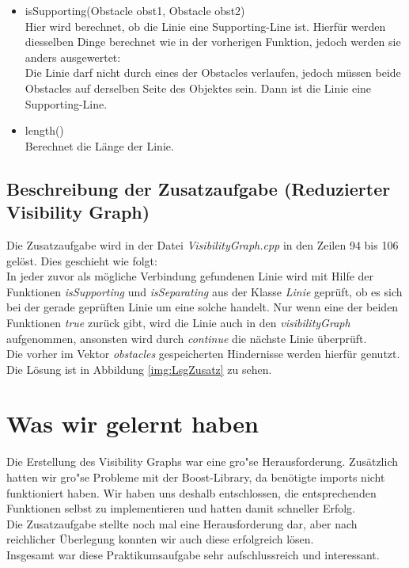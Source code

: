 \documentclass[a4paper]{scrartcl}
\begin{document}
\begin{itemize}
\item isSupporting(Obstacle obst1, Obstacle obst2)\\
Hier wird berechnet, ob die Linie eine Supporting-Line ist. Hierfür werden diesselben Dinge berechnet wie in der vorherigen Funktion, jedoch werden sie anders ausgewertet:\\
Die Linie darf nicht durch eines der Obstacles verlaufen, jedoch müssen beide Obstacles auf derselben Seite des Objektes sein. Dann ist die Linie eine Supporting-Line.\\
\item length()\\
Berechnet die Länge der Linie.
\end{itemize}


\subsection*{Beschreibung der Zusatzaufgabe (Reduzierter Visibility Graph)}
Die Zusatzaufgabe wird in der Datei \textit{VisibilityGraph.cpp} in den Zeilen 94 bis 106 gelöst. Dies geschieht wie folgt:\\
In jeder zuvor als mögliche Verbindung gefundenen Linie wird mit Hilfe der Funktionen \textit{isSupporting} und \textit{isSeparating} aus der Klasse \textit{Linie} geprüft, ob es sich bei der gerade geprüften Linie um eine solche handelt. Nur wenn eine der beiden Funktionen \textit{true} zurück gibt, wird die Linie auch in den \textit{visibilityGraph} aufgenommen, ansonsten wird durch \textit{continue} die nächste Linie überprüft.\\
Die vorher im Vektor \textit{obstacles} gespeicherten Hindernisse werden hierfür genutzt.\\

Die Lösung ist in Abbildung \ref{img:LsgZusatz} zu sehen.

\section*{Was wir gelernt haben}

Die Erstellung des Visibility Graphs war eine gro"se Herausforderung. Zusätzlich hatten wir gro"se Probleme mit der Boost-Library, da benötigte imports nicht funktioniert haben. Wir haben uns deshalb entschlossen, die entsprechenden Funktionen selbst zu implementieren und hatten damit schneller Erfolg.\\
Die Zusatzaufgabe stellte noch mal eine Herausforderung dar, aber nach reichlicher Überlegung konnten wir auch diese erfolgreich lösen.\\
Insgesamt war diese Praktikumsaufgabe sehr aufschlussreich und interessant.
\newpage
\end{document}
